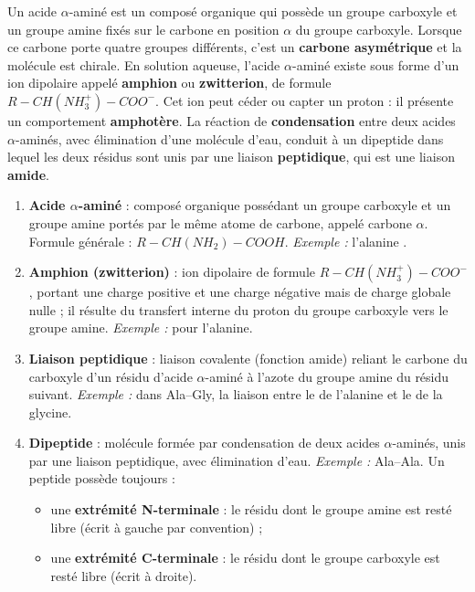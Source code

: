 \documentclass[11pt]{article}
\begin{document}
\begin{corrige}
Un acide $\alpha$-aminé est un composé organique qui possède un groupe carboxyle  et un groupe amine  fixés sur le carbone en position \textbf{$\alpha$} du groupe carboxyle. Lorsque ce carbone porte quatre groupes différents, c'est un \textbf{carbone asymétrique} et la molécule est chirale. En solution aqueuse, l'acide $\alpha$-aminé existe sous forme d'un ion dipolaire appelé \textbf{amphion} ou \textbf{zwitterion}, de formule $R-CH(NH_3^+)-COO^-$. Cet ion peut céder ou capter un proton : il présente un comportement \textbf{amphotère}. La réaction de \textbf{condensation} entre deux acides $\alpha$-aminés, avec élimination d'une molécule d'eau, conduit à un dipeptide dans lequel les deux résidus sont unis par une liaison \textbf{peptidique}, qui est une liaison \textbf{amide}.
\end{corrige}

\begin{corrige}
\begin{enumerate}
\item \textbf{Acide $\alpha$-aminé} : composé organique possédant un groupe carboxyle  et un groupe amine  portés par le même atome de carbone, appelé carbone $\alpha$. Formule générale : $R-CH(NH_2)-COOH$. \emph{Exemple :} l'alanine .
\item \textbf{Amphion (zwitterion)} : ion dipolaire de formule $R-CH(NH_3^+)-COO^-$, portant une charge positive et une charge négative mais de charge globale nulle ; il résulte du transfert interne du proton du groupe carboxyle vers le groupe amine. \emph{Exemple :}  pour l'alanine.
\item \textbf{Liaison peptidique} : liaison covalente  (fonction amide) reliant le carbone du carboxyle d'un résidu d'acide $\alpha$-aminé à l'azote du groupe amine du résidu suivant. \emph{Exemple :} dans Ala--Gly, la liaison  entre le  de l'alanine et le  de la glycine.
\item \textbf{Dipeptide} : molécule formée par condensation de deux acides $\alpha$-aminés, unis par une liaison peptidique, avec élimination d'eau. \emph{Exemple :} Ala--Ala. Un peptide possède toujours :
\begin{itemize}
\item une \textbf{extrémité N-terminale} : le résidu dont le groupe amine  est resté libre (écrit à gauche par convention) ;
\item une \textbf{extrémité C-terminale} : le résidu dont le groupe carboxyle  est resté libre (écrit à droite).
\end{itemize}
\end{enumerate}
\end{corrige}
\end{document}
